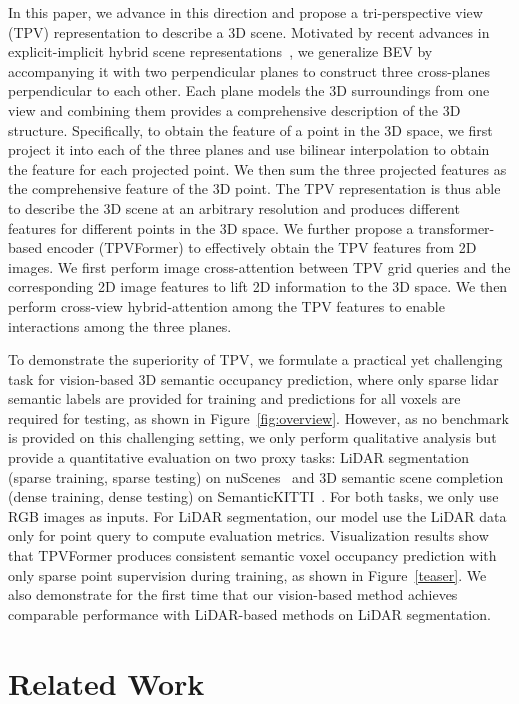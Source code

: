 \documentclass[10pt,twocolumn,letterpaper]{article}
\begin{document}
In this paper, we advance in this direction and propose a tri-perspective view (TPV) representation to describe a 3D scene.
Motivated by recent advances in explicit-implicit hybrid scene representations~\cite{triplane,tensorf}, we generalize BEV by accompanying it with two perpendicular planes to construct three cross-planes perpendicular to each other.
Each plane models the 3D surroundings from one view and combining them provides a comprehensive description of the 3D structure.
Specifically, to obtain the feature of a point in the 3D space, we first project it into each of the three planes and use bilinear interpolation to obtain the feature for each projected point.
We then sum the three projected features as the comprehensive feature of the 3D point.
The TPV representation is thus able to describe the 3D scene at an arbitrary resolution and produces different features for different points in the 3D space.
We further propose a transformer-based encoder (TPVFormer) to effectively obtain the TPV features from 2D images.
We first perform image cross-attention between TPV grid queries and the corresponding 2D image features to lift 2D information to the 3D space.
We then perform cross-view hybrid-attention among the TPV features to enable interactions among the three planes.


To demonstrate the superiority of TPV, we formulate a practical yet challenging task for vision-based 3D semantic occupancy prediction, where only sparse lidar semantic labels are provided for training and predictions for all voxels are required for testing, as shown in Figure~\ref{fig:overview}.
However, as no benchmark is provided on this challenging setting, we only perform qualitative analysis but provide a quantitative evaluation on two proxy tasks: LiDAR segmentation (sparse training, sparse testing) on nuScenes~\cite{nuscenes} and 3D semantic scene completion (dense training, dense testing) on SemanticKITTI~\cite{semantickitti}.
For both tasks, we only use RGB images as inputs.
For LiDAR segmentation, our model use the LiDAR data only for point query to compute evaluation metrics.
Visualization results show that TPVFormer produces consistent semantic voxel occupancy prediction with only sparse point supervision during training, as shown in Figure~\ref{teaser}.
We also demonstrate for the first time that our vision-based method achieves comparable performance with LiDAR-based methods on LiDAR segmentation.




 \section{Related Work}
\end{document}
